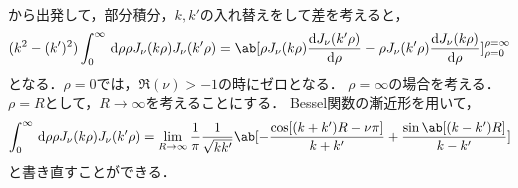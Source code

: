 \begin{enumerate}[%
  label=%
  \fbox{%
   {\thesection.\arabic*}%
    },%
    ]
\begin{enumerate}[(a)]
\begin{gather}
        \end{gather}
        から出発して，部分積分，$k, k'$の入れ替えをして差を考えると，
        \begin{gather}
          (k^2 - (k')^2) \int_0^\infty \dl{\rho} \rho J_\nu(k\rho)J_\nu(k'\rho) 
          = \ab[\rho J_\nu(k\rho)\diff{J_\nu(k'\rho)}{\rho} %
          - \rho J_\nu(k'\rho)\diff{J_\nu(k\rho)}{\rho}]_{\rho=0}^{\rho=\infty}
        \end{gather}
        となる．$\rho = 0$では，$\Re (\nu) > -1$の時にゼロとなる．
        $\rho = \infty$の場合を考える．$\rho = R$として，$R \to \infty$を考えることにする．
        Bessel関数の漸近形を用いて，
        \begin{gather}  
          \int_0^\infty \dl{\rho}\rho J_\nu(k\rho) J_\nu(k' \rho) 
          = \lim_{R\to \infty}\frac{1}{\pi}\frac{1}{\sqrt{kk'}} %
          \ab[-\frac{\cos[(k+k')R - \nu \pi]}{k+k'} + \frac{\sin\ab[(k-k')R]}{k-k'}]
        \end{gather}
        と書き直すことができる．


\end{enumerate}
\end{enumerate}

